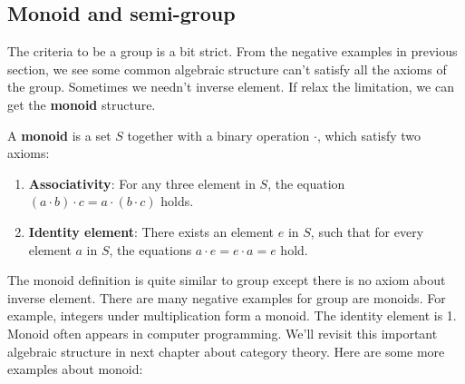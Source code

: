 \documentclass{article}
\begin{document}
\begin{Exercise}
\end{Exercise}

\subsection{Monoid and semi-group}

The criteria to be a group is a bit strict. From the negative examples in previous section, we see some common algebraic structure can't satisfy all the axioms of the group. Sometimes we needn't inverse element. If relax the limitation, we can get the \textbf{monoid} structure.

\begin{definition}
A \textbf{monoid} is a set $S$ together with a binary operation $\cdot$, which satisfy two axioms:
\begin{enumerate}
\item \textbf{Associativity}: For any three element in $S$, the equation $(a \cdot b) \cdot c = a \cdot (b \cdot c)$ holds.
\item \textbf{Identity element}: There exists an element $e$ in $S$, such that for every element $a$ in $S$, the equations $a \cdot e = e \cdot a = e$ hold.
\end{enumerate}
\end{definition}

The monoid definition is quite similar to group except there is no axiom about inverse element. There are many negative examples for group are monoids. For example, integers under multiplication form a monoid. The identity element is 1. Monoid often appears in computer programming. We'll revisit this important algebraic structure in next chapter about category theory. Here are some more examples about monoid:
\end{document}
